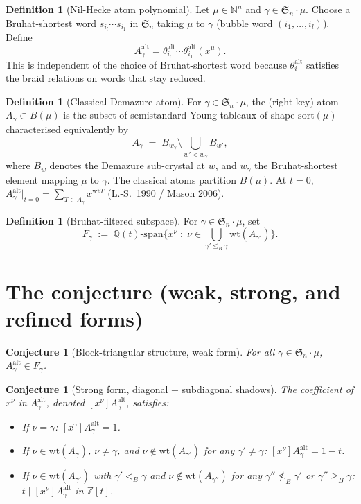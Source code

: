 \documentclass[11pt]{article}
\newtheorem{conjecture}[theorem]{Conjecture}
\theoremstyle{definition}
\newtheorem{definition}[theorem]{Definition}
\theoremstyle{remark}
\newcommand{\Aalt}{A^{\mathrm{alt}}}
\newcommand{\thetaalt}{\theta^{\mathrm{alt}}}
\newcommand{\wt}{\mathrm{wt}}
\newcommand{\Sn}{\mathfrak{S}_n}
\newcommand{\ZZ}{\mathbb{Z}}
\newcommand{\QQ}{\mathbb{Q}}
\newcommand{\NN}{\mathbb{N}}
\newcommand{\Bru}{\leq_B}
\newcommand{\Fg}{F_\gamma}
\begin{document}
\begin{definition}[Nil-Hecke atom polynomial]
Let $\mu \in \NN^n$ and $\gamma \in \Sn \cdot \mu$. Choose a
Bruhat-shortest word $s_{i_l} \cdots s_{i_1}$ in $\Sn$ taking $\mu$ to
$\gamma$ (bubble word $(i_1, \ldots, i_l)$). Define
\[
   \Aalt_\gamma = \thetaalt_{i_l} \cdots \thetaalt_{i_1} (x^\mu).
\]
This is independent of the choice of Bruhat-shortest word because
$\thetaalt_i$ satisfies the braid relations on words that stay reduced.
\end{definition}

\begin{definition}[Classical Demazure atom]
For $\gamma \in \Sn \cdot \mu$, the (right-key) atom
$A_\gamma \subset B(\mu)$ is the subset of semistandard Young tableaux
of shape $\mathrm{sort}(\mu)$ characterised equivalently by
\[
   A_\gamma \;=\; B_{w_\gamma} \setminus \bigcup_{w' < w_\gamma} B_{w'},
\]
where $B_w$ denotes the Demazure sub-crystal at $w$, and $w_\gamma$ the
Bruhat-shortest element mapping $\mu$ to $\gamma$. The classical atoms
partition $B(\mu)$. At $t = 0$,
$\Aalt_\gamma\bigr|_{t=0} = \sum_{T \in A_\gamma} x^{\wt T}$
(L.-S.\ 1990 / Mason 2006).
\end{definition}

\begin{definition}[Bruhat-filtered subspace]
For $\gamma \in \Sn \cdot \mu$, set
\[
   \Fg \;:=\; \QQ(t)\text{-span} \bigl\{ x^\nu \;:\; \nu \in \bigcup_{\gamma' \Bru \gamma} \wt(A_{\gamma'}) \bigr\}.
\]
\end{definition}

\section{The conjecture (weak, strong, and refined forms)}

\begin{conjecture}[Block-triangular structure, weak form]
\label{conj:weak}
For all $\gamma \in \Sn \cdot \mu$, $\Aalt_\gamma \in \Fg$.
\end{conjecture}

\begin{conjecture}[Strong form, diagonal + subdiagonal shadows]
\label{conj:strong}
The coefficient of $x^\nu$ in $\Aalt_\gamma$, denoted $[x^\nu]\Aalt_\gamma$, satisfies:
\begin{itemize}
   \item If $\nu = \gamma$: $[x^\gamma]\Aalt_\gamma = 1$.
   \item If $\nu \in \wt(A_\gamma)$, $\nu \neq \gamma$, and $\nu \notin \wt(A_{\gamma'})$ for any $\gamma' \neq \gamma$: $[x^\nu]\Aalt_\gamma = 1 - t$.
   \item If $\nu \in \wt(A_{\gamma'})$ with $\gamma' <_B \gamma$ and $\nu \notin \wt(A_{\gamma''})$ for any $\gamma'' \not\Bru \gamma'$ or $\gamma'' \geq_B \gamma$:
   $t \mid [x^\nu]\Aalt_\gamma$ in $\ZZ[t]$.
\end{itemize}
\end{conjecture}
\end{document}
